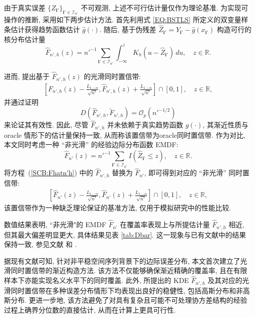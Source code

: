 \documentclass[a4paper,openay,14pt]{ctexbook}
\numberwithin{equation}{section}
\numberwithin{lem}{section}
\begin{document}
由于真实误差 $\{Z_{\mathbf{i}'}\}_{\mathbf{i}' \in \mathcal{I}_{n'}}$ 不可观测, 上述不可行估计量仅作为理论基准. 为实现可操作的推断, 采用如下两步估计方法. 首先利用式 \eqref{EQ:BSTLS} 所定义的双变量样条估计获得趋势函数估计 $\hat{g}(\cdot)$. 随后, 基于伪残差
$\hat{Z}_{\mathbf{i}'} = Y_{\mathbf{i}'} - \hat{g}(x_{\mathbf{i}'})$
构造可行的核分布估计量
\begin{equation}\label{EQ:Fn'hhat}
\hat{F}_{n',h}(z)
= n'^{-1} \sum_{\mathbf{i}' \in \mathcal{I}_{n'}}
\int_{-\infty}^{z} K_h(u - \hat{Z}_{\mathbf{i}'}) \, du,
\quad z \in \mathbb{R}.
\end{equation}

进而, 提出基于 $\hat{F}_{n',h}(z)$ 的光滑同时置信带:
\begin{align}\label{SCB:Fhatn'h}
\left[
\hat{F}_{n',h}(z) - \frac{L_{1-\alpha}}{\sqrt{n'}},
\hat{F}_{n',h}(z) + \frac{L_{1-\alpha}}{\sqrt{n'}}
\right] \cap [0,1], 
\quad z \in \mathbb{R},
\end{align}
并通过证明
\[
D\left(\hat{F}_{n',h}, \tilde{F}_{n',h}\right)
= \mathcal{O}_p(n'^{-1/2})
\]
来论证其有效性. 因此, 尽管 $\hat{F}_{n',h}$ 并未依赖于真实趋势函数 $g(\cdot)$, 其渐近性质与 oracle 情形下的估计量保持一致, 从而称该置信带为oracle同时置信带.
作为对比, 本文同时考虑一种 ``非光滑'' 的经验边际分布函数 EMDF:
\begin{equation} \label{EQ:Fn'hat}
    \hat{F}_{n'}(z) = n'^{-1}\sum_{\mathbf{i}'\in\mathcal{I}_{n'}} I(\hat{Z}_{\mathbf{i}'} \le z), \quad z \in \mathbb{R}.
\end{equation}
将方程~(\ref{SCB:Fhatn'h}) 中的 $\hat{F}_{n',h}$ 替换为 $\hat{F}_{n'}$, 即可得到对应的 ``非光滑'' 同时置信带:
\begin{align} \label{SCB:Fhatn'}
    \left[ \hat{F}_{n'}(z) - \frac{L_{1-\alpha}}{\sqrt{n'}},  \hat{F}_{n'}(z) + \frac{L_{1-\alpha}}{\sqrt{n'}} \right] \cap [0,1], \quad z \in \mathbb{R},
\end{align}
该置信带作为一种缺乏理论保证的基准方法, 仅用于模拟研究中的性能比较.


数值结果表明, ``非光滑"的 EMDF $\hat{F}_{n'}$ 在覆盖率表现上与所提估计量 $\hat{F}_{n',h}$ 相近, 但其最大偏差明显更大, 具体结果见表 \ref{tab:Dbar}. 这一现象与已有文献中的结果保持一致, 参见文献\cite{gu2021smooth} 和 \cite{wang2022oracle}.

据现有文献可知, 针对非平稳空间序列背景下的边际误差分布, 本文首次建立了光滑同时置信带的渐近构造方法. 该方法不仅能够确保渐近精确的覆盖率, 且在有限样本下亦能实现名义水平下的同时覆盖. 此外, 所提出的 KDE $\hat{F}_{n',h}$ 及其对应的光滑同时置信带在多种误差分布情形下均表现出良好的稳健性, 包括高斯分布和非高斯分布. 更进一步地, 该方法避免了对具有复杂且可能不可处理协方差结构的经验过程上确界分位数的直接估计, 从而在计算上更具可行性.
\end{document}
